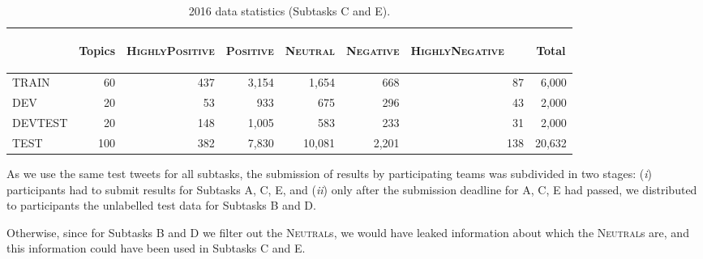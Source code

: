 \documentclass[11pt,letterpaper]{article}
\begin{document}
\begin{table}[tbh!]
  \small
  \begin{center}
    \resizebox{\columnwidth}{!} {
    \begin{tabular}{|l|r|rrrrr|r|}
      \hline
      & \multicolumn{1}{c|}{\begin{sideways}\bf Topics\end{sideways}} & \multicolumn{1}{c}{\begin{sideways}\textsc{HighlyPositive}\end{sideways}} & \multicolumn{1}{c}{\begin{sideways}\textsc{Positive}\end{sideways}} & \multicolumn{1}{c}{\begin{sideways}\textsc{Neutral}\end{sideways}} & \multicolumn{1}{c}{\begin{sideways}\textsc{Negative}\end{sideways}} & \multicolumn{1}{c|}{\begin{sideways}\textsc{HighlyNegative~~~}\end{sideways}} & \multicolumn{1}{c|}{\begin{sideways}\bf Total\end{sideways}}\\
      \hline
      TRAIN & 60 & 437 & 3,154 & 1,654 & 668 & 87 & 6,000 \\
      DEV & 20 & \phantom{0}53 & \phantom{0}933 & \phantom{0}675 & 296 & 43 & 2,000 \\
      DEVTEST & 20 & 148 & 1,005 & \phantom{0}583 & 233 & 31 & 2,000 \\
      TEST & 100 & 382 & 7,830 & 10,081 & 2,201 & 138 & 20,632 \\
      \hline
    \end{tabular}
    }
    \caption{2016 data statistics (Subtasks C and E).}
    \label{T:CorpusStatsTopicCE}
  \end{center}
\end{table}

As we use the same test tweets for all subtasks, the submission of results
by participating teams was subdivided in two stages: (\emph{i}) participants had to submit results
for Subtasks A, C, E, and (\emph{ii}) only after the submission deadline for A, C, E had
passed, we distributed to participants the unlabelled test data for Subtasks B and D. 

Otherwise, since for Subtasks B and D we filter out
the \textsc{Neutral}s, we would have leaked information about which
the \textsc{Neutral}s are, and this information could have been used
in Subtasks C and E.
\end{document}
